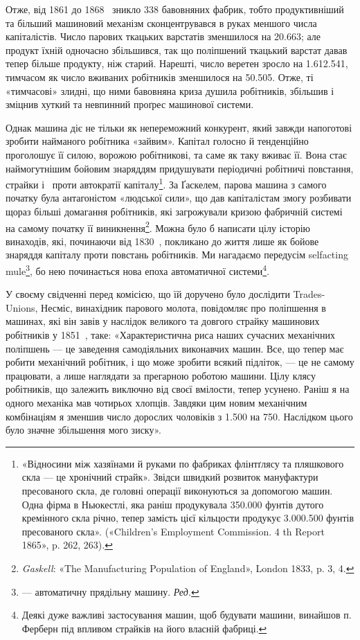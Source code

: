 Отже, від 1861 до 1868~ зникло 338 бавовняних фабрик, тобто
продуктивніший та більший машиновий механізм сконцентрувався
в руках меншого числа капіталістів. Число парових ткацьких
варстатів зменшилося на \num{20.663}; але продукт їхній одночасно
збільшився, так що поліпшений ткацький варстат давав
тепер більше продукту, ніж старий. Нарешті, число веретен
зросло на \num{1.612.541}, тимчасом як число вживаних робітників
зменшилося на \num{50.505}. Отже, ті «тимчасові» злидні, що ними бавовняна
криза душила робітників, збільшив і зміцнив хуткий
та невпинний проґрес машинової системи.

Однак машина діє не тільки як непереможний конкурент,
який завжди напоготові зробити найманого робітника «зайвим».
Капітал голосно й тенденційно проголошує її силою, ворожою
робітникові, та саме як таку вживає її. Вона стає наймогутнішим
бойовим знаряддям придушувати періодичні робітничі повстання,
страйки і~ проти автократії капіталу\footnote{
«Відносини між хазяїнами й руками по фабриках флінтґлясу та пляшкового
скла — це хронічний страйк». Звідси швидкий розвиток мануфактури
пресованого скла, де головні операції виконуються за допомогою машин.
Одна фірма в Ньюкестлі, яка раніш продукувала \num{350.000} фунтів дутого
кремінного скла річно, тепер замість цієї кільцости продукує \num{3.000.500}
фунтів пресованого скла». («Children’s Employment Commission. 4 th
Report 1865», p. 262, 263).
}. За Ґаскелем,
парова машина з самого початку була антагоністом «людської
сили», що дав капіталістам змогу розбивати щораз більші
домагання робітників, які загрожували кризою фабричній системі
на самому початку її виникнення\footnote{
\emph{Gaskell}: «The Manufacturing Population of England», London
1833, p. 3, 4.
}. Можна було б написати
цілу історію винаходів, які, починаючи від 1830~, покликано
до життя лише як бойове знаряддя капіталу проти повстань робітників.
Ми нагадаємо передусім selfacting mule\footnote*{
— автоматичну прядільну машину. \emph{Ред.}
}, бо нею починається
нова епоха автоматичної системи\footnote{
Деякі дуже важливі застосування машин, щоб будувати машини,
винайшов п. Ферберн під впливом страйків на його власній фабриці.
}.

У своєму свідченні перед комісією, що їй доручено було дослідити
Trades-Unions, Несміс, винахідник парового молота, повідомляє
про поліпшення в машинах, які він завів у наслідок
великого та довгого страйку машинових робітників у 1851~,
таке: «Характеристична риса наших сучасних механічних поліпшень
— це заведення самодіяльних виконавчих машин. Все, що
тепер має робити механічний робітник, і що може зробити всякий
підліток, — це не самому працювати, а лише наглядати за прегарною
роботою машини. Цілу клясу робітників, що залежить
виключно від своєї вмілости, тепер усунено. Раніш я на одного
механіка мав чотирьох хлопців. Завдяки цим новим механічним
комбінаціям я зменшив число дорослих чоловіків з \num{1.500} на 750.
Наслідком цього було значне збільшення мого зиску».

